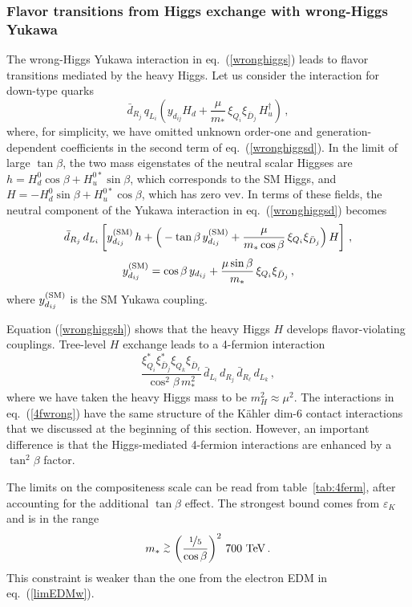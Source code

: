 \documentclass[a4paper,12pt]{article}
\newcommand{\gsim}{\stackrel{>}{_\sim}}
\newcommand{\beq}{\begin{equation}}
\newcommand{\eeq}{\end{equation}}
\def\eq#1{eq.~(\ref{#1})}
\def\tab#1{table~\ref{#1}}
\def\eq#1{eq.~(\ref{#1})}
\def\mst{m_*}
\begin{document}
{{{{\subsubsection*{Flavor transitions from Higgs exchange with wrong-Higgs Yukawa}

The wrong-Higgs Yukawa interaction in \eq{wronghiggs} leads to flavor transitions mediated by the heavy Higgs. Let us consider the interaction for down-type quarks
\beq
{\bar d}_{R_j} \, q_{L_i} \left( y_{d_{ij}}H_d+ \frac{\mu}{\mst}\,  \xi_{Q_{i}}\xi_{{\bar D}_{j}}\, 
H_u^\dagger \right) \, ,
\label{wronghiggsd}
\eeq
where, for simplicity, we have omitted unknown order-one and generation-dependent coefficients in the second term of \eq{wronghiggsd}.
In the limit of large $\tan\beta$, the two mass eigenstates of the neutral scalar Higgses are $h=H_d^0 \cos\beta + H_u^{0*}\sin \beta$, which corresponds to the SM Higgs, and $H=-H_d^0 \sin\beta + H_u^{0*}\cos \beta$, which has zero vev. In terms of these fields, the neutral component of the Yukawa interaction in \eq{wronghiggsd} becomes
\beq
{\bar d}_{R_j} \, d_{L_i} \left[ y_{d_{ij}}^{({\rm SM})} \, h +\Big( -\tan\beta \, y_{d_{ij}}^{({\rm SM})}+\frac{\mu}{\mst \cos\beta}\,  \xi_{Q_{i}}\xi_{{\bar D}_{j}}\Big)\, H \right] \, ,
\label{wronghiggsh}
\eeq
\beq
y_{d_{ij}}^{({\rm SM})} =\cos\beta \, y_{d_{ij}}+ \frac{\mu \sin\beta}{\mst}\,  \xi_{Q_{i}}\xi_{{\bar D}_{j}} \, ,
\eeq
where $y_{d_{ij}}^{({\rm SM})}$ is the SM Yukawa coupling.

Equation (\ref{wronghiggsh}) shows that the heavy Higgs $H$ develops flavor-violating couplings. Tree-level $H$ exchange leads to a 4-fermion interaction
\beq
\frac{\xi_{Q_{i}}^* \xi_{{\bar D}_{j}}^* \xi_{Q_{k}}\xi_{{\bar D}_{\ell}}}{\cos^2\beta \, \mst^2}\,
{\bar d}_{L_i} \, d_{R_j} \, {\bar d}_{R_\ell} \, d_{L_k} \, ,
\label{4fwrong}
\eeq
where we have taken the heavy Higgs mass to be $m_H^2 \approx \mu^2$. The interactions in \eq{4fwrong} have the same structure of the K\"ahler dim-6 contact interactions that we discussed at the beginning of this section. However, an important difference is that the Higgs-mediated 4-fermion interactions are enhanced by a $\tan^2\beta$ factor.

The limits on the compositeness scale can be read from \tab{tab:4ferm}, after accounting for the additional $\tan\beta$ effect. The strongest bound comes from $\varepsilon_K$ and is in the range
\beq
\mst \gsim \left(\frac{\nicefrac{1}{5}}{\cos\beta}\right)^2 \, 700~{\rm TeV}\, .
\label{limgrtan}
\eeq
This constraint is weaker than the one from the electron EDM in \eq{limEDMw}.

}}}}
\end{document}
